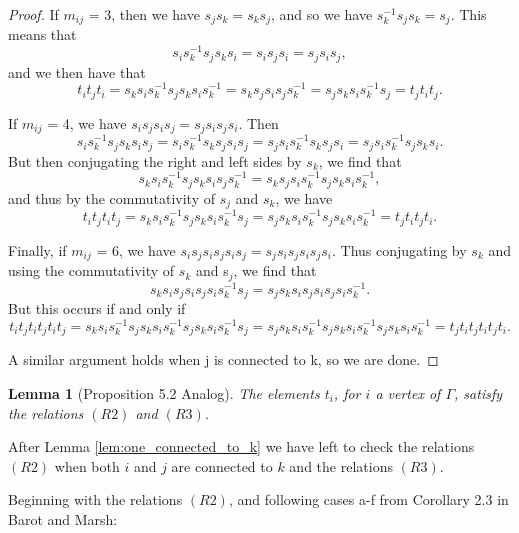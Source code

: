 \documentclass[11pt]{amsart}
\newtheorem{lem}[thm]{Lemma}
\theoremstyle{definition}
\begin{document}
\begin{proof}
If $m_{ij}$ = 3, then we have $s_{j}s_{k} = s_{k}s_{j}$, and so we have $s_{k}^{-1}s_{j}s_{k} = s_{j}.$ This means that $$s_{i}s_{k}^{-1}s_{j}s_{k}s_{i} = s_{i}s_{j}s_{i} = s_{j}s_{i}s_{j},$$ and we then have that $$t_{i}t_{j}t_{i} = s_{k}s_{i}s_{k}^{-1}s_{j}s_{k}s_{i}s_{k}^{-1} = s_{k}s_{j}s_{i}s_{j}s_{k}^{-1} = s_{j}s_{k}s_{i}s_{k}^{-1}s_{j} = t_{j}t_{i}t_{j}.$$

If $m_{ij}$ = 4, we have $s_{i}s_{j}s_{i}s_{j} = s_{j}s_{i}s_{j}s_{i}$. Then $$s_{i}s_{k}^{-1}s_{j}s_{k}s_{i}s_{j} = s_{i}s_{k}^{-1}s_{k}s_{j}s_{i}s_{j} = s_{j}s_{i}s_{k}^{-1}s_{k}s_{j}s_{i} = s_{j}s_{i}s_{k}^{-1}s_{j}s_{k}s_{i}.$$ But then conjugating the right and left sides by $s_{k}$, we find that $$s_{k}s_{i}s_{k}^{-1}s_{j}s_{k}s_{i}s_{j}s_{k}^{-1} = s_{k}s_{j}s_{i}s_{k}^{-1}s_{j}s_{k}s_{i}s_{k}^{-1},$$ and thus by the commutativity of $s_{j}$ and $s_{k}$, we have $$t_{i}t_{j}t_{i}t_{j} = s_{k}s_{i}s_{k}^{-1}s_{j}s_{k}s_{i}s_{k}^{-1}s_{j} = s_{j}s_{k}s_{i}s_{k}^{-1}s_{j}s_{k}s_{i}s_{k}^{-1} = t_{j}t_{i}t_{j}t_{i}.$$

Finally, if $m_{ij}$ = 6, we have $s_{i}s_{j}s_{i}s_{j}s_{i}s_{j} = s_{j}s_{i}s_{j}s_{i}s_{j}s_{i}$. Thus conjugating by $s_{k}$ and using the commutativity of  $s_{k}$ and s$_{j}$, we find that $$s_{k}s_{i}s_{j}s_{i}s_{j}s_{i}s_{k}^{-1}s_{j} = s_{j}s_{k}s_{i}s_{j}s_{i}s_{j}s_{i}s_{k}^{-1}.$$ But this occurs if and only if $$t_{i}t_{j}t_{i}t_{j}t_{i}t_{j} = s_{k}s_{i}s_{k}^{-1}s_{j}s_{k}s_{i}s_{k}^{-1}s_{j}s_{k}s_{i}s_{k}^{-1}s_{j} = s_{j}s_{k}s_{i}s_{k}^{-1}s_{j}s_{k}s_{i}s_{k}^{-1}s_{j}s_{k}s_{i}s_{k}^{-1} = t_{j}t_{i}t_{j}t_{i}t_{j}t_{i}.$$ 

A similar argument holds when j is connected to k, so we are done.
\end{proof} 


\begin{lem}[Proposition 5.2 Analog] The elements $t_i$, for $i$ a vertex of $\Gamma$, satisfy the relations $(R2)$ and $(R3)$.
\end{lem}

After Lemma \ref{lem:one_connected_to_k} we have left to check the relations $(R2)$ when both $i$ and $j$ are connected to $k$ and the relations $(R3)$.


Beginning with the relations $(R2)$, and following cases a-f from Corollary 2.3 in Barot and Marsh:
\end{document}

